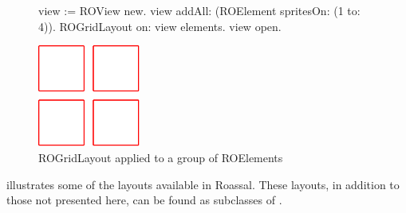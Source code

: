 \documentclass[a4paper,10pt,twoside]{book}
\begin{document}
\begin{figure}[H]
\begin{minipage}[t]{0.55\textwidth}
\vspace{0pt}
\begin{code}{}
view := ROView new.
view addAll: (ROElement spritesOn: (1 to: 4)).
ROGridLayout on: view elements.
view open.
\end{code}
   \end{minipage}
   \hfill
   \begin{minipage}[t]{0.6\textwidth}
      \vspace{0pt} \raggedright
       \centering
		\includegraphics[width=0.3\textwidth]{ROGrid2} %
   \end{minipage}

\caption{ROGridLayout applied to a group of ROElements}
\label{fig:primerLayout}
\end{figure} 

 illustrates some of the layouts available in Roassal. These layouts, in addition to those not presented here, can be found as subclasses of .
\end{document}
